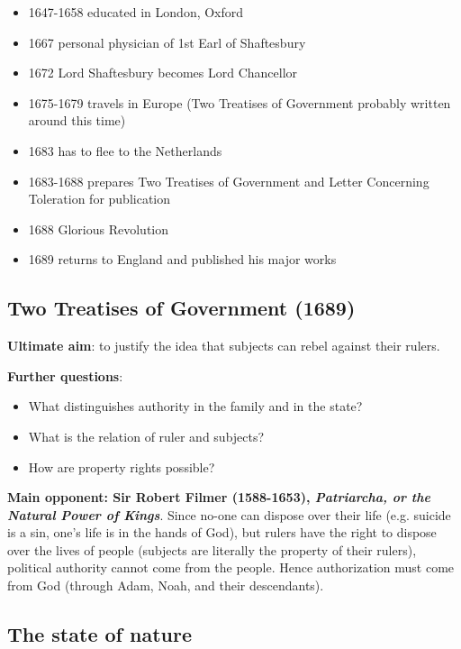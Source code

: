 \begin{itemize}
    \item 1647-1658 educated in London, Oxford
    \item 1667 personal physician of 1st Earl of Shaftesbury
    \item 1672 Lord Shaftesbury becomes Lord Chancellor
    \item 1675-1679 travels in Europe (Two Treatises of Government probably
    written around this time)
    \item 1683 has to flee to the Netherlands
    \item 1683-1688 prepares Two Treatises of Government and Letter Concerning
    Toleration for publication
    \item 1688 Glorious Revolution
    \item 1689 returns to England and published his major works
\end{itemize}

\subsection{Two Treatises of Government (1689)}

\textbf{Ultimate aim}: to justify the idea that subjects can rebel against their
rulers.

\textbf{Further questions}:

\begin{itemize}
    \item What distinguishes authority in the family and in the state?
    \item What is the relation of ruler and subjects?
    \item How are property rights possible?
\end{itemize}

\textbf{Main opponent: Sir Robert Filmer (1588-1653), \textit{Patriarcha, or
the Natural Power of Kings}}. Since no-one can dispose over their life (e.g.
suicide is a sin, one's life is in the hands of God), but rulers have the right
to dispose over the lives of people (subjects are literally the property of
their rulers), political authority cannot come from the people. Hence
authorization must come from God (through Adam, Noah, and their descendants).

\subsection{The state of nature}

